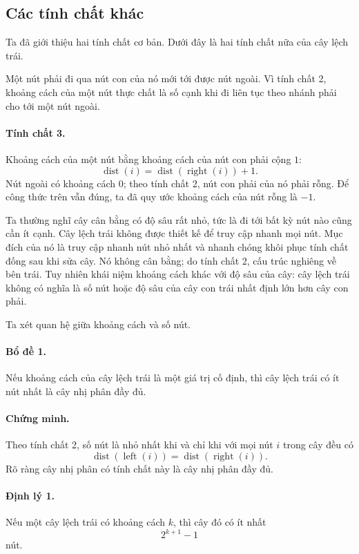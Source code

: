 \documentclass[11pt]{article}
\begin{document}
\subsection{Các tính chất khác}

Ta đã giới thiệu hai tính chất cơ bản. Dưới đây là hai tính chất nữa của cây
lệch trái.

Một nút phải đi qua nút con của nó mới tới được nút ngoài. Vì tính chất 2,
khoảng cách của một nút thực chất là số cạnh khi đi liên tục theo nhánh phải
cho tới một nút ngoài.

\paragraph{Tính chất 3.}
Khoảng cách của một nút bằng khoảng cách của nút con phải cộng \(1\):
\[
  \operatorname{dist}(i)=\operatorname{dist}(\operatorname{right}(i))+1.
\]
Nút ngoài có khoảng cách \(0\); theo tính chất 2, nút con phải của nó phải rỗng.
Để công thức trên vẫn đúng, ta đã quy ước khoảng cách của nút rỗng là \(-1\).

Ta thường nghĩ cây cân bằng có độ sâu rất nhỏ, tức là đi tới bất kỳ nút nào cũng
cần ít cạnh. Cây lệch trái không được thiết kế để truy cập nhanh mọi nút. Mục
đích của nó là truy cập nhanh nút nhỏ nhất và nhanh chóng khôi phục tính chất
đống sau khi sửa cây. Nó không cân bằng; do tính chất 2, cấu trúc nghiêng về
bên trái. Tuy nhiên khái niệm khoảng cách khác với độ sâu của cây: cây lệch
trái không có nghĩa là số nút hoặc độ sâu của cây con trái nhất định lớn hơn
cây con phải.

Ta xét quan hệ giữa khoảng cách và số nút.

\paragraph{Bổ đề 1.}
Nếu khoảng cách của cây lệch trái là một giá trị cố định, thì cây lệch trái có
ít nút nhất là cây nhị phân đầy đủ.

\paragraph{Chứng minh.}
Theo tính chất 2, số nút là nhỏ nhất khi và chỉ khi với mọi nút \(i\) trong cây
đều có
\[
  \operatorname{dist}(\operatorname{left}(i))
  =
  \operatorname{dist}(\operatorname{right}(i)).
\]
Rõ ràng cây nhị phân có tính chất này là cây nhị phân đầy đủ.

\paragraph{Định lý 1.}
Nếu một cây lệch trái có khoảng cách \(k\), thì cây đó có ít nhất
\[
  2^{k+1}-1
\]
nút.
\end{document}
